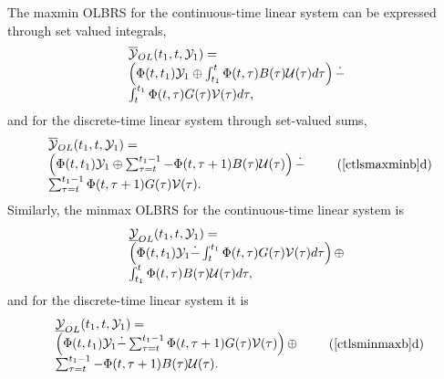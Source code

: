 The maxmin OLBRS for the continuous-time linear system can be expressed through
set valued integrals,
\begin{equation}
\begin{array}{l}
\OYOL(t_1, t, \YY_1) = \\
\left(\Phi(t, t_1)\YY_1 \oplus
\int_{t_1}^t\Phi(t, \tau)B(\tau)\UU(\tau)d\tau\right) \dot{-} \\
\int_{t}^{t_1}\Phi(t, \tau)G(\tau)\VV(\tau)d\tau,
\end{array}
\label{ctlsmaxminb}
\end{equation}
and for the discrete-time linear system through set-valued sums,
\begin{equation}
\begin{array}{l}
\OYOL(t_1, t, \YY_1) = \\
\left(\Phi(t, t_1)\YY_1 \oplus
\sum_{\tau=t}^{t_1-1}-\Phi(t, \tau+1)B(\tau)\UU(\tau)\right) \dot{-} \\
\sum_{\tau=t}^{t_1-1}\Phi(t, \tau+1)G(\tau)\VV(\tau).
\end{array}
\tag*{(\ref{ctlsmaxminb}d)}
\label{dtlsmaxminb}
\end{equation}
Similarly, the minmax OLBRS for the continuous-time linear system is
\begin{equation}
\begin{array}{l}
\UYOL(t_1, t, \YY_1) = \\
\left(\Phi(t, t_1)\YY_1 \dot{-}
\int_{t}^{t_1}\Phi(t, \tau)G(\tau)\VV(\tau)d\tau\right)
\oplus \\
\int_{t_1}^{t}\Phi(t, \tau)B(\tau)\UU(\tau)d\tau,
\end{array}
\label{ctlsminmaxb}
\end{equation}
and for the discrete-time linear system it is
\begin{equation}
\begin{array}{l}
\UYOL(t_1, t, \YY_1) = \\
\left(\Phi(t, t_1)\YY_1 \dot{-}
\sum_{\tau=t}^{t_1-1}\Phi(t, \tau+1)G(\tau)\VV(\tau)\right)
\oplus \\
\sum_{\tau=t}^{t_1-1}-\Phi(t, \tau+1)B(\tau)\UU(\tau).
\end{array}
\tag*{(\ref{ctlsminmaxb}d)}
\label{dtlsminmaxb}
\end{equation}

